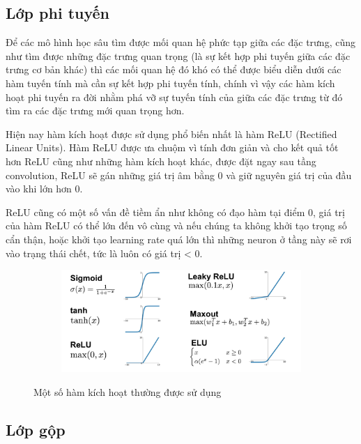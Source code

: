 \subsection{Lớp phi tuyến}

Để các mô hình học sâu tìm được mối quan hệ phức tạp giữa các đặc trưng, cũng như tìm được những đặc trưng quan trọng
(là sự kết hợp phi tuyến giữa các đặc trưng cơ bản khác) thì các mối quan hệ đó khó có thể được biểu diễn dưới các hàm tuyến tính
mà cần sự kết hợp phi tuyến tính, chính vì vậy các hàm kích hoạt phi tuyến ra đời nhằm phá vỡ sự tuyến tính của giữa các đặc trưng từ đó tìm
ra các đặc trưng mới quan trọng hơn.

Hiện nay hàm kích hoạt được sử dụng phổ biến nhất là hàm ReLU (Rectified Linear Units). Hàm ReLU được ưa chuộm vì tính đơn giản và cho kết quả tốt hơn
ReLU cũng như những hàm kích hoạt khác, được đặt ngay sau tầng convolution, ReLU sẽ gán những giá trị âm bằng 0 và giữ nguyên giá trị của đầu vào khi lớn hơn 0.

ReLU cũng có một số vấn đề tiềm ẩn như không có đạo hàm tại điểm 0, giá trị của hàm ReLU có thể lớn đến vô cùng và
nếu chúng ta không khởi tạo trọng số cẩn thận, hoặc khởi tạo learning rate quá lớn thì những neuron ở tầng này sẽ rơi vào trạng thái chết, tức là luôn có giá trị < 0.

\begin{figure}
    \begin{subfigure}{1.\textwidth}
        \begin{center}
            \includegraphics[width=1.\linewidth]{Chapters/items/chap2_6.jpg}
        \end{center}
        \label{fig: chap2_6}
    \end{subfigure}
    \caption{Một số hàm kích hoạt thường được sử dụng}
\end{figure}

\newpage
\subsection{Lớp gộp}

